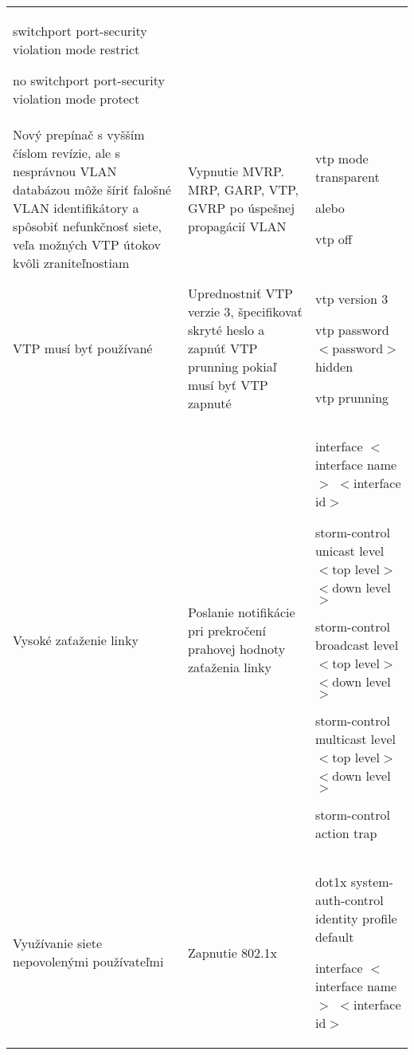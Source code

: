 \begin{longtable}[!htbp]{|L{10em}L{10em}>{\selectfont}L{34em}|}
	\hspace{0.5em}switchport port-security violation mode restrict
	
	\hspace{0.5em}no switchport port-security violation mode protect\\
	
	
	
	
	Nový prepínač s vyšším číslom revízie, ale s nesprávnou VLAN databázou môže šíriť falošné VLAN identifikátory a spôsobiť nefunkčnosť siete, veľa možných VTP útokov kvôli zraniteľnostiam 	&Vypnutie MVRP. MRP, GARP, VTP, GVRP po úspešnej propagácií VLAN	&vtp mode transparent
	
	\vspace{0.5em}
	{\selectfont alebo}
	\vspace{0.5em}
	
	vtp off\\
	
	
	
	
	VTP musí byť používané	&Uprednostniť VTP verzie 3, špecifikovať skryté heslo a zapnúť VTP prunning pokiaľ musí byť VTP zapnuté	&vtp version 3
	
	vtp password $<$password$>$ hidden
	
	vtp prunning\\
	
	
	
	
	Vysoké zaťaženie linky	&Poslanie notifikácie pri prekročení prahovej hodnoty zaťaženia linky	&interface $<$interface name$>$ $<$interface id$>$
	
	\hspace{0.5em}storm-control unicast level $<$top level$>$ $<$down level$>$
	
	\hspace{0.5em}storm-control broadcast level $<$top level$>$ $<$down level$>$
	
	\hspace{0.5em}storm-control multicast level $<$top level$>$ $<$down level$>$
	
	\hspace{0.5em}storm-control action trap\\
	
	
	
	
	 Využívanie siete nepovolenými používateľmi	&Zapnutie 802.1x 	&dot1x system-auth-control
	identity profile default
	
	
	interface $<$interface name$>$ $<$interface id$>$
	

\end{longtable}
